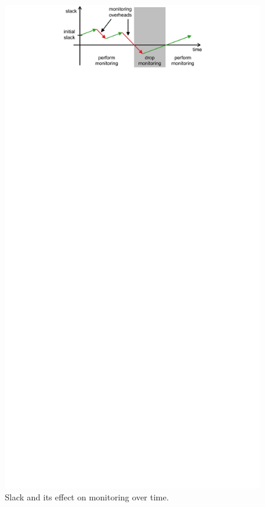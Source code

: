\begin{figure} 
  \begin{center}
    \includegraphics{monitoring_dift_drop/figs/slack.pdf} 
    \caption{Slack and its effect on monitoring over time.}
    \label{fig:monitoring_dift_drop.policies.slack} 
  \end{center} 
\end{figure}


